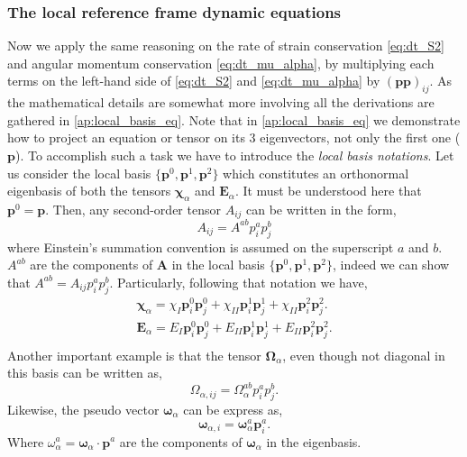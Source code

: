 \subsubsection{The local reference frame dynamic equations}

Now we apply the same reasoning on the rate of strain conservation \eqref{eq:dt_S2} and angular momentum conservation \eqref{eq:dt_mu_alpha},
by multiplying each terms on the left-hand side of \ref{eq:dt_S2} and \ref{eq:dt_mu_alpha} by $(\textbf{pp})_{ij}$. 
As the mathematical details are somewhat more involving all the derivations are gathered in \ref{ap:local_basis_eq}. 
Note that in \ref{ap:local_basis_eq} we demonstrate how to project an equation or tensor on its $3$ eigenvectors, not only the first one ($\textbf{p}$). 
To accomplish such a task we have to introduce the \textit{local basis notations}. 
Let us consider the local basis $\{\textbf{p}^0, \textbf{p}^1, \textbf{p}^2\}$ which constitutes an orthonormal eigenbasis of both the tensors $\bm\chi_\alpha$ and $\textbf{E}_\alpha$. 
It must be understood here that $\textbf{p}^0 = \textbf{p}$. 
Then, any second-order tensor $A_{ij}$ can be written in the form, 
\begin{equation*}
    A_{ij}
    = 
    A^{ab} p_i^ap_j^b
\end{equation*}
where Einstein's summation convention is assumed on the superscript $a$ and $b$.
$A^{ab}$ are the components of \textbf{A} in the local basis  $\{\textbf{p}^0, \textbf{p}^1, \textbf{p}^2\}$, indeed we can show that $A^{ab} = A_{ij} p_i^ap_j^b$. 
Particularly, following that notation we have,  
\begin{align*}
    \bm\chi_\alpha
    = 
    \chi_I  \textbf{p}_i^0\textbf{p}_j^0
    + \chi_{II}  \textbf{p}_i^1\textbf{p}_j^1
    + \chi_{II}  \textbf{p}_i^2\textbf{p}_j^2. \\
    \textbf{E}_\alpha
    = 
    E_I  \textbf{p}_i^0\textbf{p}_j^0
    + E_{II}  \textbf{p}_i^1\textbf{p}_j^1
    + E_{II}  \textbf{p}_i^2\textbf{p}_j^2. \\
\end{align*}
Another important example is that the tensor $\bm\Omega_\alpha$, even though not diagonal in this basis can be written as, 
\begin{equation*}
    \Omega_{\alpha,ij}
    = 
    \Omega^{ab}_\alpha p_i^ap_j^b. 
\end{equation*}
Likewise, the pseudo vector $\bm\omega_\alpha$ can be express as, 
\begin{equation*}
    \bm\omega_{\alpha,i}
    = \bm\omega_\alpha^a \textbf{p}_i^a. 
\end{equation*}
Where $\omega_\alpha^a = \bm\omega_\alpha \cdot \textbf{p}^a$ are the components of $\bm\omega_\alpha$ in the eigenbasis. 


